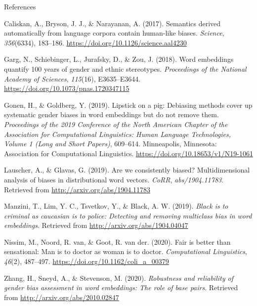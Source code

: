 \documentclass[10pt,ignorenonframetext,x11names, dvipsnames, bibspacing,natbib]{beamer}
\begin{document}
\begin{frame}{References}
\protect\hypertarget{references}{}

\tiny

\hypertarget{refs}{}
\leavevmode\hypertarget{ref-Caliskan2017semanticsBiases}{}%
Caliskan, A., Bryson, J. J., \& Narayanan, A. (2017). Semantics derived
automatically from language corpora contain human-like biases.
\emph{Science}, \emph{356}(6334), 183--186.
\url{https://doi.org/10.1126/science.aal4230}

\leavevmode\hypertarget{ref-Garg2018years}{}%
Garg, N., Schiebinger, L., Jurafsky, D., \& Zou, J. (2018). Word
embeddings quantify 100 years of gender and ethnic stereotypes.
\emph{Proceedings of the National Academy of Sciences}, \emph{115}(16),
E3635--E3644. \url{https://doi.org/10.1073/pnas.1720347115}

\leavevmode\hypertarget{ref-Gonen2019lipstick}{}%
Gonen, H., \& Goldberg, Y. (2019). Lipstick on a pig: Debiasing methods
cover up systematic gender biases in word embeddings but do not remove
them. \emph{Proceedings of the 2019 Conference of the North American
Chapter of the Association for Computational Linguistics: Human Language
Technologies, Volume 1 (Long and Short Papers)}, 609--614. Minneapolis,
Minnesota: Association for Computational Linguistics.
\url{https://doi.org/10.18653/v1/N19-1061}

\leavevmode\hypertarget{ref-Lauscher2019multidimensional}{}%
Lauscher, A., \& Glavas, G. (2019). Are we consistently biased?
Multidimensional analysis of biases in distributional word vectors.
\emph{CoRR}, \emph{abs/1904.11783}. Retrieved from
\url{http://arxiv.org/abs/1904.11783}

\leavevmode\hypertarget{ref-Manzini2019blackToCriminal}{}%
Manzini, T., Lim, Y. C., Tsvetkov, Y., \& Black, A. W. (2019).
\emph{Black is to criminal as caucasian is to police: Detecting and
removing multiclass bias in word embeddings}. Retrieved from
\url{http://arxiv.org/abs/1904.04047}

\leavevmode\hypertarget{ref-Nissim2020fair}{}%
Nissim, M., Noord, R. van, \& Goot, R. van der. (2020). Fair is better
than sensational: Man is to doctor as woman is to doctor.
\emph{Computational Linguistics}, \emph{46}(2), 487--497.
\url{https://doi.org/10.1162/coli_a_00379}

\leavevmode\hypertarget{ref-zhang2020robustness}{}%
Zhang, H., Sneyd, A., \& Stevenson, M. (2020). \emph{Robustness and
reliability of gender bias assessment in word embeddings: The role of
base pairs}. Retrieved from \url{http://arxiv.org/abs/2010.02847}

\end{frame}
\end{document}
